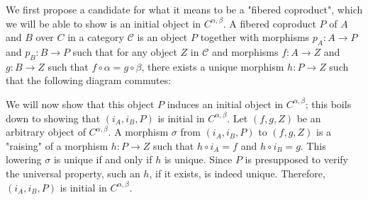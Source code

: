 
We first propose a candidate for what it means to be a "fibered coproduct", which we will be able to show is an initial object in $C^{\alpha,\beta}$. A fibered coproduct $P$ of $A$ and $B$ over $C$ in a category $\mathcal{C}$ is an object $P$ together with morphisms $p_A : A \to P$ and $p_B : B \to P$ such that for any object $Z$ in $\mathcal{C}$ and morphisms $f : A \to Z$ and $g : B \to Z$ such that $f \circ \alpha = g \circ \beta$, there exists a unique morphism $h : P \to Z$ such that the following diagram commutes:


We will now show that this object $P$ induces an initial object in $C^{\alpha,\beta}$; this boils down to showing that $(i_A, i_B, P)$ is initial in $C^{\alpha,\beta}$. Let $(f, g, Z)$ be an arbitrary object of $C^{\alpha,\beta}$. A morphism $\sigma$ from $(i_A, i_B, P)$ to $(f, g, Z)$ is a "raising" of a morphism $h : P \to Z$ such that $h \circ i_A = f$ and $h \circ i_B = g$. This lowering $\sigma$ is unique if and only if $h$ is unique. Since $P$ is presupposed to verify the universal property, such an $h$, if it exists, is indeed unique. Therefore, $(i_A, i_B, P)$ is initial in $C^{\alpha,\beta}$.


